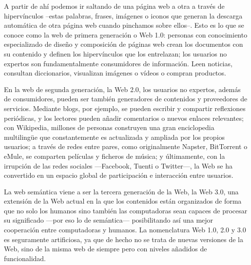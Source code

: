 A partir de ahí podemos ir saltando de una página web a otra a través de hipervínculos –estas palabras, frases, imágenes o iconos que generan la descarga automática de otra página web cuando pinchamos sobre ellos–. Esto es lo que se conoce como la web de primera generación o Web 1.0: personas con conocimiento especializado de diseño y composición de páginas web crean los documentos con su contenido y definen los hipervínculos que los entrelazan; los usuarios no expertos son fundamentalmente consumidores de información. Leen noticias, consultan diccionarios, visualizan imágenes o vídeos o compran productos. 

En la web de segunda generación, la Web 2.0, los usuarios no expertos, además de consumidores, pueden ser también generadores de contenidos y proveedores de servicios. Mediante blogs, por ejemplo, se pueden escribir y compartir reflexiones periódicas, y los lectores pueden añadir comentarios o nuevos enlaces relevantes; con Wikipedia, millones de personas construyen una gran enciclopedia multilingüe que constantemente es actualizada y ampliada por los propios usuarios; a través de redes entre pares, como originalmente Napster, BitTorrent o eMule, se comparten películas y ficheros de música; y últimamente, con la irrupción de las redes sociales —Facebook, Tuenti o Twitter—, la Web se ha convertido en un espacio global de participación e interacción entre usuarios.

La web semántica viene a ser la tercera generación de la Web, la Web 3.0, una extensión de la Web actual en la que los contenidos están organizados de forma que no solo los humanos sino también las computadoras sean capaces de procesar su significado —por eso lo de semántica— posibilitando así una mejor cooperación entre computadoras y humanos. La nomenclatura Web 1.0, 2.0 y 3.0 es seguramente artificiosa, ya que de hecho no se trata de nuevas versiones de la Web, sino de la misma web de siempre pero con niveles añadidos de funcionalidad. 



